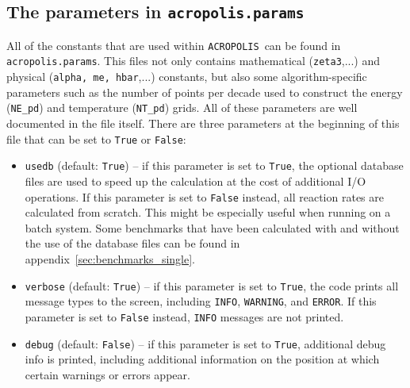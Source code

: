 \documentclass[11pt,a4paper]{article}
\newcommand{\acropolis}{\texttt{ACROPOLIS}~}
\begin{document}
\subsection{The parameters in \texttt{acropolis.params}}
\label{sec:params}
All of the constants that are used within \acropolis can be found in \texttt{acropolis.params}. This files not only contains mathematical (\texttt{zeta3},...) and physical (\texttt{alpha, me, hbar},...) constants, but also some algorithm-specific parameters such as the number of points per decade used to construct the energy (\texttt{NE\_pd}) and temperature (\texttt{NT\_pd}) grids. All of these parameters are well documented in the file itself.
There are three parameters at the beginning of this file that can be set to \texttt{True} or \texttt{False}:
\begin{itemize}
	\item \texttt{usedb} (default: \texttt{True}) -- if this parameter is set to \texttt{True}, the optional database files are used to speed up the calculation at the cost of additional I/O operations. If this parameter is set to \texttt{False} instead, all reaction rates are calculated from scratch. This might be especially useful when running on a batch system. Some benchmarks that have been calculated with and without the use of the database files can be found in appendix~\ref{sec:benchmarks_single}.
	\item \texttt{verbose} (default: \texttt{True}) -- if this parameter is set to \texttt{True}, the code prints all message types to the screen, including \texttt{INFO}, \texttt{WARNING}, and \texttt{ERROR}. If this parameter is set to \texttt{False} instead, \texttt{INFO} messages are not printed.
	\item \texttt{debug} (default: \texttt{False}) -- if this parameter is set to \texttt{True}, additional debug info is printed, including additional information on the position at which certain warnings or errors appear.
\end{itemize}
\end{document}
